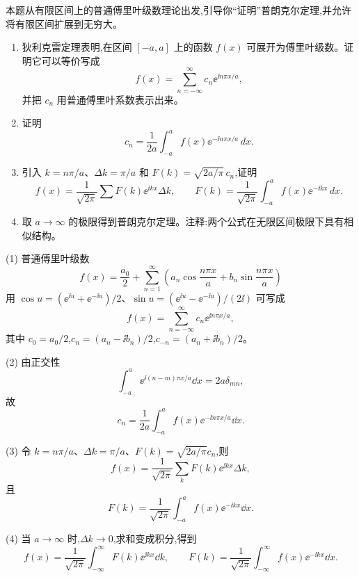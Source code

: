 \begin{question}
本题从有限区间上的普通傅里叶级数理论出发,引导你“证明”普朗克尔定理,并允许将有限区间扩展到无穷大。
\begin{enumerate}
\item 狄利克雷定理表明,在区间 $[-a,a]$ 上的函数 $f(x)$ 可展开为傅里叶级数。证明它可以等价写成
\[
f(x)=\sum_{n=-\infty}^{\infty}c_n \ee^{\ii n\pi x/a},
\]
并把 $c_n$ 用普通傅里叶系数表示出来。
\item 证明
\[
c_n=\frac{1}{2a}\int_{-a}^{a}f(x)\ee^{-\ii n\pi x/a}\,dx .
\]
\item 引入 $k=n\pi/a$、$\Delta k=\pi/a$ 和 $F(k)=\sqrt{2a/\pi}\,c_n$,证明
\[
f(x)=\frac{1}{\sqrt{2\pi}}\sum F(k)\ee^{\ii kx}\Delta k,
\qquad
F(k)=\frac{1}{\sqrt{2\pi}}\int_{-a}^{a}f(x)\ee^{-\ii kx}\,dx .
\]
\item 取 $a\to\infty$ 的极限得到普朗克尔定理。注释:两个公式在无限区间极限下具有相似结构。
\end{enumerate}
\end{question}
\begin{solution}
(1) 普通傅里叶级数
\[
f(x)=\frac{a_0}{2}+\sum_{n=1}^\infty\left(a_n\cos\frac{n\pi x}{a}+b_n\sin\frac{n\pi x}{a}\right)
\]
用 $\cos u=(\ee^{\ii u}+\ee^{-\ii u})/2$、$\sin u=(\ee^{\ii u}-\ee^{-\ii u})/(2\ii)$ 可写成
\[
f(x)=\sum_{n=-\infty}^{\infty}c_n\ee^{\ii n\pi x/a},
\]
其中 $c_0=a_0/2$,$c_n=(a_n-\ii b_n)/2$,$c_{-n}=(a_n+\ii b_n)/2$。

(2) 由正交性
\[
\int_{-a}^{a}\ee^{\ii(n-m)\pi x/a}\dd x=2a\delta_{mn},
\]
故
\[
c_n=\frac1{2a}\int_{-a}^{a}f(x)\ee^{-\ii n\pi x/a}\dd x.
\]

(3) 令 $k=n\pi/a$、$\Delta k=\pi/a$、$F(k)=\sqrt{2a/\pi}c_n$,则
\[
f(x)=\frac1{\sqrt{2\pi}}\sum_k F(k)\ee^{\ii kx}\Delta k,
\]
且
\[
F(k)=\frac1{\sqrt{2\pi}}\int_{-a}^{a}f(x)\ee^{-\ii kx}\dd x.
\]

(4) 当 $a\to\infty$ 时,$\Delta k\to0$,求和变成积分,得到
\[
f(x)=\frac1{\sqrt{2\pi}}\int_{-\infty}^{\infty}F(k)\ee^{\ii kx}\dd k,
\qquad
F(k)=\frac1{\sqrt{2\pi}}\int_{-\infty}^{\infty}f(x)\ee^{-\ii kx}\dd x.
\]
\end{solution}


